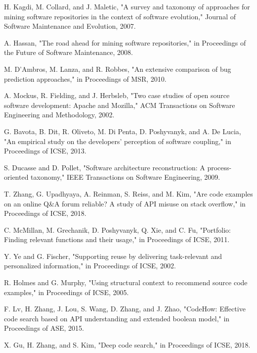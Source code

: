 \documentclass[conference]{IEEEtran}
\begin{document}
\begin{thebibliography}{1}

H. Kagdi, M. Collard, and J. Maletic, "A survey and taxonomy of approaches for mining software repositories in the context of software evolution," Journal of Software Maintenance and Evolution, 2007.

A. Hassan, "The road ahead for mining software repositories," in Proceedings of the Future of Software Maintenance, 2008.

M. D'Ambros, M. Lanza, and R. Robbes, "An extensive comparison of bug prediction approaches," in Proceedings of MSR, 2010.

A. Mockus, R. Fielding, and J. Herbsleb, "Two case studies of open source software development: Apache and Mozilla," ACM Transactions on Software Engineering and Methodology, 2002.

G. Bavota, B. Dit, R. Oliveto, M. Di Penta, D. Poshyvanyk, and A. De Lucia, "An empirical study on the developers' perception of software coupling," in Proceedings of ICSE, 2013.

S. Ducasse and D. Pollet, "Software architecture reconstruction: A process-oriented taxonomy," IEEE Transactions on Software Engineering, 2009.

T. Zhang, G. Upadhyaya, A. Reinman, S. Reiss, and M. Kim, "Are code examples on an online Q\&A forum reliable? A study of API misuse on stack overflow," in Proceedings of ICSE, 2018.

C. McMillan, M. Grechanik, D. Poshyvanyk, Q. Xie, and C. Fu, "Portfolio: Finding relevant functions and their usage," in Proceedings of ICSE, 2011.

Y. Ye and G. Fischer, "Supporting reuse by delivering task-relevant and personalized information," in Proceedings of ICSE, 2002.

R. Holmes and G. Murphy, "Using structural context to recommend source code examples," in Proceedings of ICSE, 2005.

F. Lv, H. Zhang, J. Lou, S. Wang, D. Zhang, and J. Zhao, "CodeHow: Effective code search based on API understanding and extended boolean model," in Proceedings of ASE, 2015.

X. Gu, H. Zhang, and S. Kim, "Deep code search," in Proceedings of ICSE, 2018.


\end{thebibliography}
\end{document}
